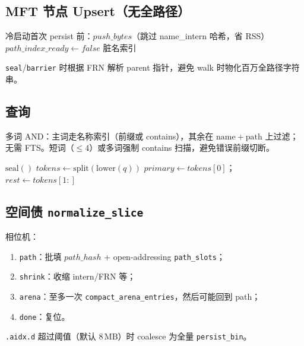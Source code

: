 \documentclass[UTF8,a4paper,11pt]{ctexart}
\begin{document}
\subsection{MFT 节点 Upsert（无全路径）}
\begin{algorithm}[htbp]
\caption{indexd.upsert\_node$(name, frn, parent\_frn, is\_dir)$}
冷启动首次 persist 前：$push\_bytes$（跳过 name\_intern 哈希，省 RSS）\;
$path\_index\_ready \leftarrow false$\; 脏名索引\;
\end{algorithm}
\texttt{seal}/\texttt{barrier} 时根据 FRN 解析 parent 指针，避免 walk 时物化百万全路径字符串。

\subsection{查询}
多词 AND：主词走名称索引（前缀或 contains），其余在 $\mathrm{name}+\mathrm{path}$ 上过滤；无需 FTS。短词（$\le 4$）或多词强制 contains 扫描，避免错误前缀切断。

\begin{algorithm}[htbp]
\caption{indexd.query$(q, limit, mode)$}
$\mathrm{seal}()$\;
$tokens \leftarrow \mathrm{split}(\mathrm{lower}(q))$\;
$primary \leftarrow tokens[0]$；$rest \leftarrow tokens[1:]$\;
\end{algorithm}

\subsection{空间债 \texttt{normalize\_slice}}
相位机：
\begin{enumerate}[leftmargin=1.6em]
  \item \texttt{path}：批填 $path\_hash$ + open-addressing \texttt{path\_slots}；
  \item \texttt{shrink}：收缩 intern/FRN 等；
  \item \texttt{arena}：至多一次 \texttt{compact\_arena\_entries}，然后可能回到 path；
  \item \texttt{done}：复位。
\end{enumerate}
\texttt{.aidx.d} 超过阈值（默认 $8\,\mathrm{MB}$）时 coalesce 为全量 \texttt{persist\_bin}。
\end{document}
